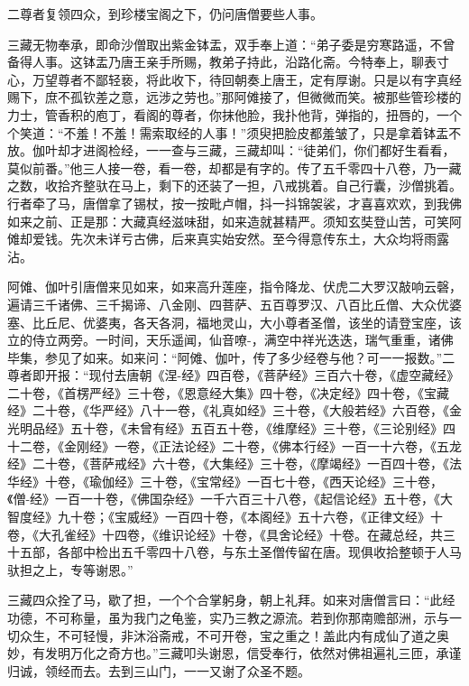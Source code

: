 \documentclass[12pt,UTF8]{ctexbook}
\begin{document}
{	二尊者复领四众，到珍楼宝阁之下，仍问唐僧要些人事。
	
	三藏无物奉承，即命沙僧取出紫金钵盂，双手奉上道：“弟子委是穷寒路遥，不曾备得人事。这钵盂乃唐王亲手所赐，教弟子持此，沿路化斋。今特奉上，聊表寸心，万望尊者不鄙轻亵，将此收下，待回朝奏上唐王，定有厚谢。只是以有字真经赐下，庶不孤钦差之意，远涉之劳也。”那阿傩接了，但微微而笑。被那些管珍楼的力士，管香积的庖丁，看阁的尊者，你抹他脸，我扑他背，弹指的，扭唇的，一个个笑道：“不羞！不羞！需索取经的人事！”须臾把脸皮都羞皱了，只是拿着钵盂不放。伽叶却才进阁检经，一一查与三藏，三藏却叫：“徒弟们，你们都好生看看，莫似前番。”他三人接一卷，看一卷，却都是有字的。传了五千零四十八卷，乃一藏之数，收拾齐整驮在马上，剩下的还装了一担，八戒挑着。自己行囊，沙僧挑着。行者牵了马，唐僧拿了锡杖，按一按毗卢帽，抖一抖锦袈裟，才喜喜欢欢，到我佛如来之前、正是那：大藏真经滋味甜，如来造就甚精严。须知玄奘登山苦，可笑阿傩却爱钱。先次未详亏古佛，后来真实始安然。至今得意传东土，大众均将雨露沾。
	
	阿傩、伽叶引唐僧来见如来，如来高升莲座，指令降龙、伏虎二大罗汉敲响云磬，遍请三千诸佛、三千揭谛、八金刚、四菩萨、五百尊罗汉、八百比丘僧、大众优婆塞、比丘尼、优婆夷，各天各洞，福地灵山，大小尊者圣僧，该坐的请登宝座，该立的侍立两旁。一时间，天乐遥闻，仙音嘹-，满空中祥光迭迭，瑞气重重，诸佛毕集，参见了如来。如来问：“阿傩、伽叶，传了多少经卷与他？可一一报数。”二尊者即开报：“现付去唐朝《涅-经》四百卷，《菩萨经》三百六十卷，《虚空藏经》二十卷，《首楞严经》三十卷，《恩意经大集》四十卷，《决定经》四十卷，《宝藏经》二十卷，《华严经》八十一卷，《礼真如经》三十卷，《大般若经》六百卷，《金光明品经》五十卷，《未曾有经》五百五十卷，《维摩经》三十卷，《三论别经》四十二卷，《金刚经》一卷，《正法论经》二十卷，《佛本行经》一百一十六卷，《五龙经》二十卷，《菩萨戒经》六十卷，《大集经》三十卷，《摩竭经》一百四十卷，《法华经》十卷，《瑜伽经》三十卷，《宝常经》一百七十卷，《西天论经》三十卷，《僧-经》一百一十卷，《佛国杂经》一千六百三十八卷，《起信论经》五十卷，《大智度经》九十卷；《宝威经》一百四十卷，《本阁经》五十六卷，《正律文经》十卷，《大孔雀经》十四卷，《维识论经》十卷，《具舍论经》十卷。在藏总经，共三十五部，各部中检出五千零四十八卷，与东土圣僧传留在唐。现俱收拾整顿于人马驮担之上，专等谢恩。”
	
	三藏四众拴了马，歇了担，一个个合掌躬身，朝上礼拜。如来对唐僧言曰：“此经功德，不可称量，虽为我门之龟鉴，实乃三教之源流。若到你那南赡部洲，示与一切众生，不可轻慢，非沐浴斋戒，不可开卷，宝之重之！盖此内有成仙了道之奥妙，有发明万化之奇方也。”三藏叩头谢恩，信受奉行，依然对佛祖遍礼三匝，承谨归诚，领经而去。去到三山门，一一又谢了众圣不题。
	
}
\end{document}
